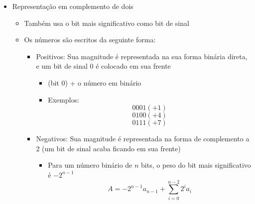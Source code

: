 \documentclass[12pt]{article}
\begin{document}
\begin{itemize}
\begin{itemize}
\begin{itemize}
\begin{itemize}
                        \item A magnitude do número
                        \item O sinal dos dois operandos
                    \end{itemize}
                    \item Existem duas representações de 0:
                    \[
                    \begin{array}{l}
                        +0_{10} = 00000000 \\
                        -0_{10} = 10000000 \\
                    \end{array}
                    \]
                \end{itemize}
            \end{itemize}
            \item Representação em complemento de dois
            \begin{itemize}
                \item Também usa o bit mais significativo como bit de sinal
                \item Os números são escritos da seguinte forma:
                \begin{itemize}
                    \item Positivos: Sua magnitude é representada na sua forma 
                    binária direta, e um bit de sinal 0 é colocado em sua frente
                    \begin{itemize}
                        \item (bit 0) + o número em binário
                        \item Exemplos:
                        \[0001 (+1)\] \[0100 (+4)\] \[0111 (+7)\]
                    \end{itemize}
                    \item Negativos: Sua magnitude é representada na forma de 
                    complemento a 2 (um bit de sinal acaba ficando em sua 
                    frente)
                    \begin{itemize}
                        \item Para um número binário de $n$ bits, o peso do bit 
                        mais significativo é $-2^{n-1}$
                        \[ A = -2^{n-1} a_{n-1} + \sum\limits_{i=0}^{n-2}2^ia_i \]
                    \end{itemize}
                \end{itemize}

\end{itemize}
\end{itemize}
\end{document}
